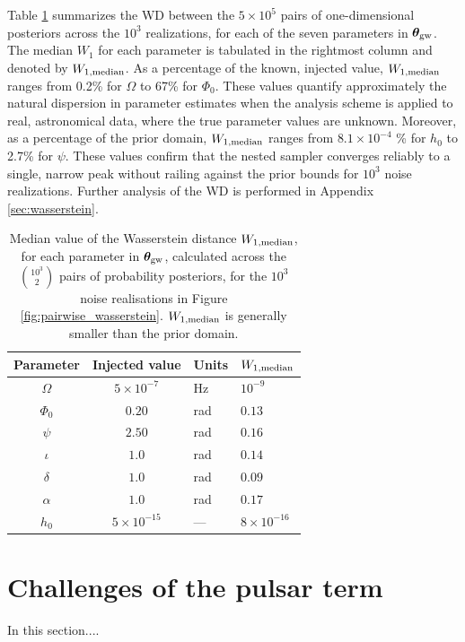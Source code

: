 \documentclass[fleqn,usenatbib,useAMS]{mnras}
\begin{document}
Table \ref{tab:Wasserstein} summarizes the WD between the $5\times 10^5$ pairs of one-dimensional posteriors across the $10^3$ realizations, for each of the seven parameters in ${\boldsymbol{\theta}}_{\rm gw}$. The median $W_1$ for each parameter is tabulated in the rightmost column and denoted by $W_{1,{\rm median}}$. As a percentage of the known, injected value, $W_{\rm 1,median}$ ranges from  0.2\% for $\Omega$ to 67\% for $\Phi_0$. These values quantify approximately the natural dispersion in parameter estimates when the analysis scheme is applied to real, astronomical data, where the true parameter values are unknown. Moreover, as a percentage of the prior domain, $W_{\rm 1,median}$ ranges from $8.1 \times 10^{-4}$ \% for $h_0$ to 2.7\% for $\psi$. These values confirm that the nested sampler converges reliably to a single, narrow peak without railing against the prior bounds for $10^3$ noise realizations. Further analysis of the WD is performed in Appendix \ref{sec:wasserstein}.

\begin{table}
	\centering
	\begin{tabular}{ccll}
		\toprule
		Parameter & Injected value & Units & $W_{1, \rm median}$  \\
		\hline
		$\Omega$     &   $5 \times 10^{-7}$ & Hz & $10^{-9}$ \\
		$\Phi_0$          & $0.20$ & rad & $0.13$ \\
		$\psi$              & $2.50$ & rad & $0.16$ \\
		$\iota$             & $1.0$ & rad & $0.14$ \\ 
		$\delta$              & $1.0$  & rad & $0.09$ \\
		$\alpha$          & $1.0$  & rad & $0.17$\\
		$h_0$            & $5 \times 10^{-15}$ & --- & $8 \times 10^{-16}$ \\
		\bottomrule
	\end{tabular}
	\caption{Median value of the Wasserstein distance $W_{1, \rm median}$, for each parameter in $\boldsymbol{\theta}_{\rm gw}$, calculated across the $10^3 \choose 2$ pairs of probability posteriors, for the $10^3$ noise realisations in Figure \ref{fig:pairwise_wasserstein}. $W_{1, \rm median}$ is generally smaller than the prior domain.}
	\label{tab:Wasserstein}
\end{table}





\section{Challenges of the pulsar term}\label{sec:psr_term_challenges}
In this section....
\end{document}
